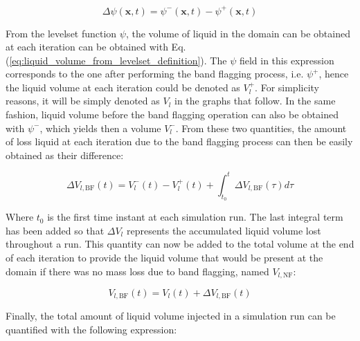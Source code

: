 \begin{equation}
\label{eq:ch5_LS_loss_delta_psi_field}
\Delta \psi \left( \textbf{x}, t \right) = \psi^- \left( \textbf{x}, t \right)  - \psi^+ \left( \textbf{x}, t \right) 
\end{equation}

From the levelset function $\psi$, the volume of liquid in the domain can be obtained at each iteration can be obtained with Eq. (\ref{eq:liquid_volume_from_levelset_definition}). The $\psi$ field in this expression corresponds to the one after performing the band flagging process, i.e. $\psi^+$, hence the liquid volume at each iteration could be denoted as $V_l^+$. For simplicity reasons, it will be simply denoted as $V_l$ in the graphs that follow. In the same fashion, liquid volume before the band flagging operation can also be obtained with $\psi^-$, which yields then a volume $V_l^-$. From these two quantities, the amount of loss liquid at each iteration due to the band flagging process can then be easily obtained as their difference:

\begin{equation}
\label{eq:ch5_LS_loss_delta_Vl_BF}
\Delta V_{l,\mathrm{BF}}  \left( t \right) = V_l^- \left( t \right)  - V_l^+ \left( t \right) + \int_{t_0}^t \Delta V_{l,\mathrm{BF}} \left( \tau \right) d\tau
\end{equation}

Where $t_0$ is the first time instant at each simulation run. The last integral term has been added so that $\Delta V_l$ represents the accumulated liquid volume lost throughout a run. This quantity can now be added to the total volume at the end of each iteration to provide the liquid volume that would be present at the domain if there was no mass loss due to band flagging, named $V_{l,\mathrm{NF}}$:

\begin{equation}
\label{eq:ch5_liquid_volume_no_flagging}
V_{l,\mathrm{BF}}  \left( t \right) = V_l  \left( t \right) + \Delta V_{l,\mathrm{BF}} \left( t \right)
\end{equation}

Finally, the total amount of liquid volume injected in a simulation run can be quantified with the following expression:


